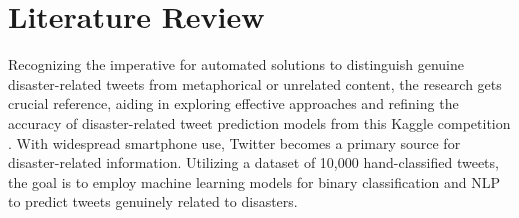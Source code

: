 \chapter{Literature Review}
\label{ch:lit_rev} %
Recognizing the imperative for automated solutions to distinguish genuine disaster-related tweets from metaphorical or unrelated content, the research gets crucial reference, aiding in exploring effective approaches and refining the accuracy of disaster-related tweet prediction models from this Kaggle competition \cite{nlp-getting-started} \cite{nlp-getting-started2}. With widespread smartphone use, Twitter becomes a primary source for disaster-related information. Utilizing a dataset of 10,000 hand-classified tweets, the goal is to employ machine learning models for binary classification and NLP to predict tweets genuinely related to disasters. 

